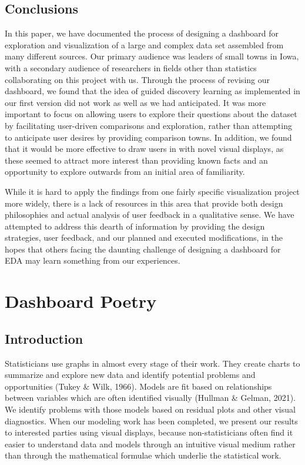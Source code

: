 \documentclass[print]{nuthesis}
\begin{document}
\hypertarget{conclusions}{%
\section{Conclusions}\label{conclusions}}

In this paper, we have documented the process of designing a dashboard for exploration and visualization of a large and complex data set assembled from many different sources. Our primary audience was leaders of small towns in Iowa, with a secondary audience of researchers in fields other than statistics collaborating on this project with us. Through the process of revising our dashboard, we found that the idea of guided discovery learning as implemented in our first version did not work as well as we had anticipated. It was more important to focus on allowing users to explore their questions about the dataset by facilitating user-driven comparisons and exploration, rather than attempting to anticipate user desires by providing comparison towns. In addition, we found that it would be more effective to draw users in with novel visual displays, as these seemed to attract more interest than providing known facts and an opportunity to explore outwards from an initial area of familiarity.

While it is hard to apply the findings from one fairly specific visualization project more widely, there is a lack of resources in this area that provide both design philosophies and actual analysis of user feedback in a qualitative sense. We have attempted to address this dearth of information by providing the design strategies, user feedback, and our planned and executed modifications, in the hopes that others facing the daunting challenge of designing a dashboard for EDA may learn something from our experiences.

\hypertarget{math-sci}{%
\chapter{Dashboard Poetry}\label{math-sci}}

\hypertarget{introduction-2}{%
\section{Introduction}\label{introduction-2}}

Statisticians use graphs in almost every stage of their work.
They create charts to summarize and explore new data and identify potential problems and opportunities (Tukey \& Wilk, 1966).
Models are fit based on relationships between variables which are often identified visually (Hullman \& Gelman, 2021).
We identify problems with those models based on residual plots and other visual diagnostics.
When our modeling work has been completed, we present our results to interested parties using visual displays, because non-statisticians often find it easier to understand data and models through an intuitive visual medium rather than through the mathematical formulae which underlie the statistical work.
\end{document}

